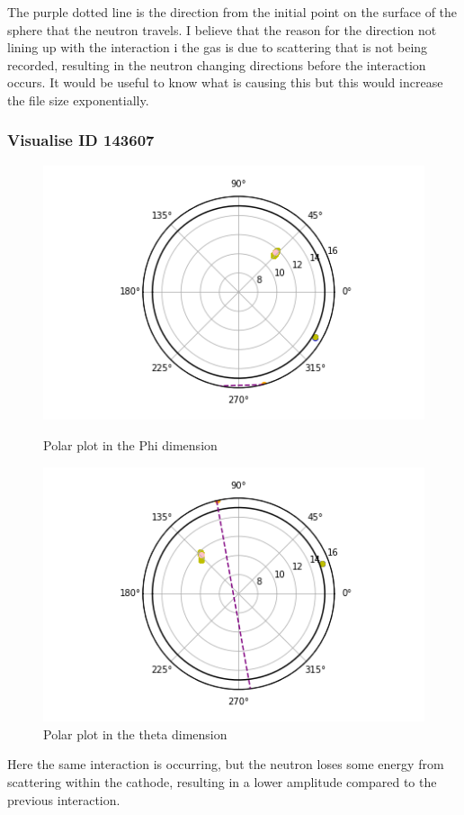 \documentclass[a4paper]{article}
\begin{document}
\noindent The purple dotted line is the direction from the initial point on the surface of the sphere that the neutron travels. I believe that the reason for the direction not lining up with the interaction i the gas is due to scattering that is not being recorded, resulting in the neutron changing directions before the interaction occurs. It would be useful to know what is causing this but this would increase the file size exponentially. 
\subsubsection{Visualise ID 143607}
\begin{figure}[H]
    \centering
    \begin{minipage}{.5\textwidth}
        \centering
        \includegraphics[width=1\linewidth]{Fast/143607_phi.png}
        \caption{Polar plot in the Phi dimension}
        \label{fig:prob1_6_2}
    \end{minipage}%
    \begin{minipage}{0.5\textwidth}
        \centering
        \includegraphics[width=1\linewidth]{Fast/143607_theta.png}
        \caption{Polar plot in the theta dimension}
        \label{fig:prob1_6_1}
    \end{minipage}
\end{figure}
\noindent Here the same interaction is occurring, but the neutron loses some energy from scattering within the cathode, resulting in a lower amplitude compared to the previous interaction.
\end{document}
